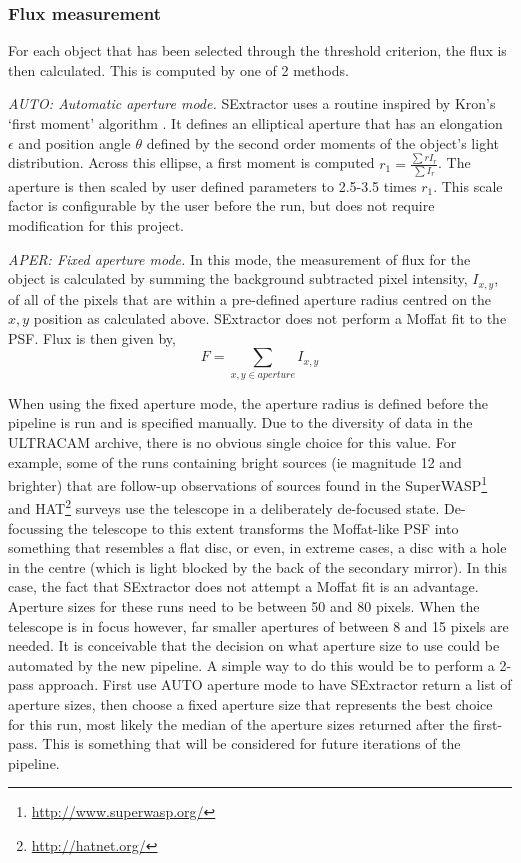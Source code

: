 \subsubsection{Flux measurement}
For each object that has been selected through the threshold criterion, the flux is then calculated. This is computed by one of 2 methods. 

\emph{AUTO: Automatic aperture mode.}
SExtractor uses a routine inspired by Kron's `first moment' algorithm \citep{kron}. It defines an elliptical aperture that has an elongation $\epsilon$ and position angle $\theta$ defined by the second order moments of the object's light distribution. Across this ellipse, a first moment is computed $r_1 = \frac{\sum r I_r}{\sum{I_r}}$. The aperture is then scaled by user defined parameters to 2.5-3.5 times $r_1$. This scale factor is configurable by the user before the run, but does not require modification for this project. 

\emph{APER: Fixed aperture mode.}
In this mode, the measurement of flux for the object is calculated by summing the background subtracted pixel intensity, $I_{x,y}$,  of all of the pixels that are within a pre-defined aperture radius centred on the $x, y$ position as calculated above. SExtractor does not perform a Moffat fit to the PSF.  Flux is then given by, \begin{equation}F = \sum\limits_{x,y \in aperture}I_{x,y}\end{equation}

When using the fixed aperture mode, the aperture radius is defined before the pipeline is run and is specified manually. Due to the diversity of data in the ULTRACAM archive, there is no obvious single choice for this value. For example, some of the runs containing bright sources (ie magnitude 12 and brighter) that are follow-up observations of sources found in the {SuperWASP}\footnote{\url{http://www.superwasp.org/}} \citep{PollaccoSuperWASP} and {HAT}\footnote{\url{http://hatnet.org/}} \citep{BakosHATNet} surveys use the telescope in a deliberately de-focused state. De-focussing the telescope to this extent transforms the Moffat-like PSF into something that resembles a flat disc, or even, in extreme cases, a disc with a hole in the centre (which is light blocked by the back of the secondary mirror). In this case, the fact that SExtractor does not attempt a Moffat fit is an advantage. Aperture sizes for these runs need to be between 50 and 80 pixels. When the telescope is in focus however, far smaller apertures of between 8 and 15 pixels are needed. It is conceivable that the decision on what aperture size to use could be automated by the new pipeline. A simple way to do this would be to perform a 2-pass approach. First use AUTO aperture mode to have SExtractor return a list of aperture sizes, then choose a fixed aperture size that represents the best choice for this run, most likely the median of the aperture sizes returned after the first-pass. This is something that will be considered for future iterations of the pipeline. 

